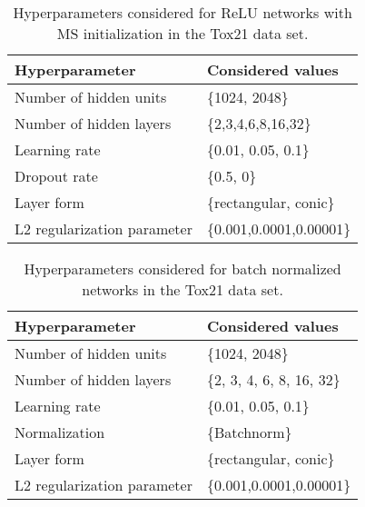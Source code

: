 \documentclass{article}
\begin{document}
\begin{table}[htp]
\begin{center}
\caption[Hyperparameters considered for ReLU networks in the Tox21 data set.]{Hyperparameters considered for ReLU networks with MS initialization in the Tox21 data set.}
\begin{tabular}{ll}
\toprule
Hyperparameter  & Considered values \\ 
\midrule
   Number of hidden units & \{1024, 2048\} \\
  Number of hidden layers & \{2,3,4,6,8,16,32\} \\
  Learning rate & \{0.01, 0.05, 0.1\} \\
  Dropout rate & \{0.5, 0\}\\
  Layer form & \{rectangular, conic\} \\
  L2 regularization parameter &  \{0.001,0.0001,0.00001\} \\
\bottomrule
\end{tabular}
\end{center}
\end{table}




\begin{table}[htp]
\begin{center}
\caption{Hyperparameters considered for batch normalized networks in the Tox21 data set.}

\begin{tabular}{ll}
\toprule
Hyperparameter  & Considered values \\ 
\midrule
  Number of hidden units & \{1024, 2048\} \\
  Number of hidden layers & \{2, 3, 4, 6, 8, 16, 32\} \\
  Learning rate & \{0.01, 0.05, 0.1\} \\
  Normalization & \{Batchnorm\} \\
  Layer form & \{rectangular, conic\} \\
  L2 regularization parameter &  \{0.001,0.0001,0.00001\} \\

\bottomrule
\end{tabular}
\end{center}

\end{table}
\end{document}
